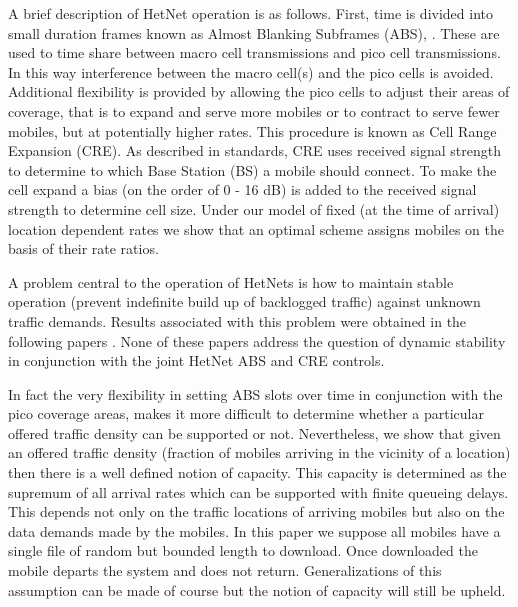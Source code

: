 \documentclass[12pt, draftcls, onecolumn]{IEEEtranTCOM}
\begin{document}
A brief description of HetNet operation is as follows. First, time
is divided into small duration frames known as Almost Blanking Subframes
(ABS), \cite{standards}. These are used to time share between macro cell
transmissions and pico cell transmissions.  In this way interference between
the macro cell(s) and the pico cells is avoided. Additional
flexibility is provided by allowing the pico cells to adjust their
areas of coverage, that is to expand and serve more mobiles or to
contract to serve fewer mobiles, but at potentially higher rates. This
procedure is known as Cell Range Expansion (CRE). As described in standards, CRE uses received signal strength to
determine to which Base Station (BS) a mobile should connect. To make the cell
expand a bias (on the order of 0 - 16 dB) is added to the received signal strength
to determine cell size. Under our model of fixed (at the time
of arrival) location dependent rates we show that an optimal scheme assigns mobiles on
the basis of their rate ratios.



A problem central to the operation of HetNets is how to maintain
stable operation (prevent indefinite build up of backlogged traffic) against
unknown traffic demands. Results associated with this problem
were obtained  in the following papers \cite{Andrews2012,Chen2011,Hu2011,Rudolf2012,VTC2013,ICC2013}. None of these papers address the question of
dynamic stability in conjunction with the joint HetNet ABS and
CRE controls.

In fact the very flexibility in setting ABS slots over time in
conjunction with the pico coverage areas, makes it more difficult
to determine whether a particular offered traffic density can be
supported or not. Nevertheless, we show that given an
offered traffic density (fraction of mobiles arriving in the vicinity
of a location) then there is a well defined notion of capacity. This capacity
is determined as the supremum of all arrival rates which can be supported
with finite queueing delays. This depends not only on the
traffic locations of arriving mobiles but also on the data demands made by the mobiles. In this
paper we suppose all mobiles have a single file of random but bounded length
to download. Once downloaded the mobile departs the system
and does not return. Generalizations of this assumption can be
made of course but the notion of capacity will still be upheld.
\end{document}
